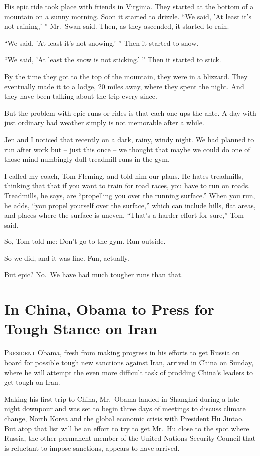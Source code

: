 ﻿\documentclass[12pt]{article}
\begin{document}
His epic ride took place with friends in Virginia. They started at the bottom of a mountain on a
sunny morning. Soon it started to drizzle. ``We said, 'At least it's not raining,' '' Mr.~Swan said.
Then, as they ascended, it started to rain.

``We said, 'At least it's not snowing.' '' Then it started to snow.

``We said, 'At least the snow is not sticking.' '' Then it started to stick.

By the time they got to the top of the mountain, they were in a blizzard. They eventually made it to
a lodge, 20 miles away, where they spent the night. And they have been talking about the trip every
since.

But the problem with epic runs or rides is that each one ups the ante. A day with just ordinary bad
weather simply is not memorable after a while.

Jen and I noticed that recently on a dark, rainy, windy night. We had planned to run after work but
-- just this once -- we thought that maybe we could do one of those mind-numbingly dull treadmill
runs in the gym.

I called my coach, Tom Fleming, and told him our plans. He hates treadmills, thinking that that if
you want to train for road races, you have to run on roads. Treadmills, he says, are ``propelling
you over the running surface.'' When you run, he adds, ``you propel yourself over the surface,''
which can include hills, flat areas, and places where the surface is uneven. ``That's a harder
effort for sure,'' Tom said.

So, Tom told me: Don't go to the gym. Run outside.

So we did, and it was fine. Fun, actually.

But epic? No.~We have had much tougher runs than that.

\section{In China, Obama to Press for Tough Stance on Iran}

\lettrine{P}{resident} Obama, fresh from making progress in his efforts to
get Russia on board for possible tough new sanctions against Iran, arrived in China on Sunday, where
he will attempt the even more difficult task of prodding China's leaders to get tough on Iran.

Making his first trip to China, Mr.~Obama landed in Shanghai during a late-night downpour and was
set to begin three days of meetings to discuss climate change, North Korea and the global economic
crisis with President Hu Jintao. But atop that list will be an effort to try to get Mr.~Hu close to
the spot where Russia, the other permanent member of the United Nations Security Council that is
reluctant to impose sanctions, appears to have arrived.
\end{document}
